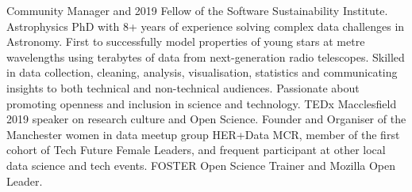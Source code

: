 
\begin{cvpubs}
  \cvpub
    {
      \begin{cvlist}
  \item {Community Manager and 2019 Fellow of the Software Sustainability Institute. Astrophysics PhD with 8+ years of experience solving complex data challenges in Astronomy. First to successfully model properties of young stars at metre wavelengths using terabytes of data from next-generation radio telescopes. Skilled in data collection, cleaning, analysis, visualisation, statistics and communicating insights to both technical and non-technical audiences. Passionate about promoting openness and inclusion in science and technology. TEDx Macclesfield 2019 speaker on research culture and Open Science. Founder and Organiser of the Manchester women in data meetup group HER+Data MCR, member of the first cohort of Tech Future Female Leaders, and frequent participant at other local data science and tech events. FOSTER Open Science Trainer and Mozilla Open Leader.}
      \end{cvlist}
    }
\end{cvpubs}

